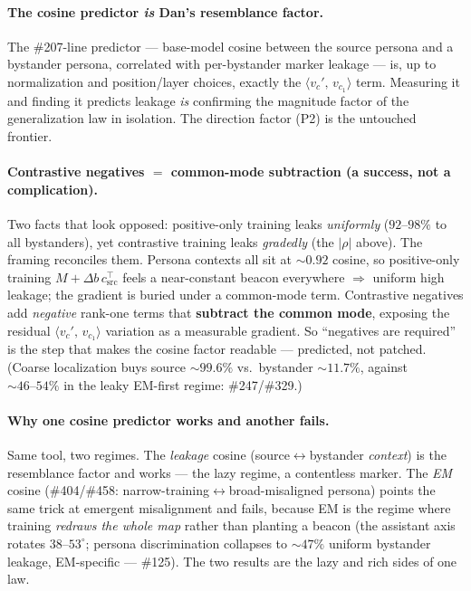 \documentclass[11pt]{article}
\newcommand{\ip}[2]{\langle #1,\, #2\rangle}
\newcommand{\db}{\Delta b}
\begin{document}
\paragraph{The cosine predictor \emph{is} Dan's resemblance factor.} The \#207-line
predictor --- base-model cosine between the source persona and a bystander persona,
correlated with per-bystander marker leakage --- is, up to normalization and
position/layer choices, exactly the $\ip{v_c'}{v_{c_1}}$ term. Measuring it and finding it
predicts leakage \emph{is} confirming the magnitude factor of the generalization law in
isolation. The direction factor (P2) is the untouched frontier.

\paragraph{Contrastive negatives $=$ common-mode subtraction (a success, not a
complication).} Two facts that look opposed: positive-only training leaks
\emph{uniformly} ($92\text{–}98\%$ to all bystanders), yet contrastive training leaks
\emph{gradedly} (the $|\rho|$ above). The framing reconciles them. Persona contexts all
sit at $\sim\!0.92$ cosine, so positive-only training $M+\db\,c_{\text{src}}^{\top}$ feels
a near-constant beacon everywhere $\Rightarrow$ uniform high leakage; the gradient is
buried under a common-mode term. Contrastive negatives add \emph{negative} rank-one terms
that \textbf{subtract the common mode}, exposing the residual $\ip{v_c'}{v_{c_1}}$
variation as a measurable gradient. So ``negatives are required'' is the step that makes
the cosine factor readable --- predicted, not patched. (Coarse localization buys source
$\sim\!99.6\%$ vs.\ bystander $\sim\!11.7\%$, against $\sim\!46\text{–}54\%$ in the leaky
EM-first regime: \#247/\#329.)

\paragraph{Why one cosine predictor works and another fails.} Same tool, two regimes.
The \emph{leakage} cosine (source$\leftrightarrow$bystander \emph{context}) is the
resemblance factor and works --- the lazy regime, a contentless marker. The
\emph{EM} cosine (\#404/\#458: narrow-training$\leftrightarrow$broad-misaligned persona)
points the same trick at emergent misalignment and fails, because EM is the regime where
training \emph{redraws the whole map} rather than planting a beacon (the assistant axis
rotates $38\text{–}53^\circ$; persona discrimination collapses to $\sim\!47\%$ uniform
bystander leakage, EM-specific --- \#125). The two results are the lazy and rich sides of
one law.
\end{document}
